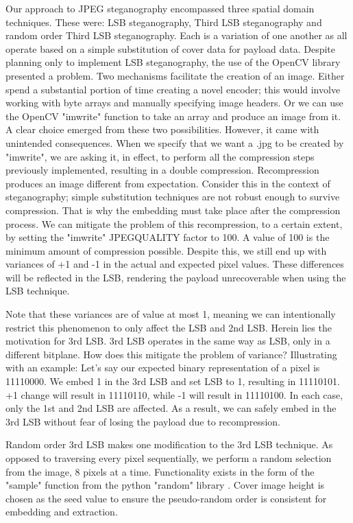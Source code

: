 \documentclass{l4proj}
\begin{document}
Our approach to JPEG steganography encompassed three spatial domain techniques. These were: LSB steganography, Third LSB steganography and random order Third LSB steganography. Each is a variation of one another as all operate based on a simple substitution of cover data for payload data. Despite planning only to implement LSB steganography, the use of the OpenCV library presented a problem. Two mechanisms facilitate the creation of an image. Either spend a substantial portion of time creating a novel encoder; this would involve working with byte arrays and manually specifying image headers. Or we can use the OpenCV "imwrite" function to take an array and produce an image from it. A clear choice emerged from these two possibilities. However, it came with unintended consequences.  When we specify that we want a .jpg to be created by "imwrite", we are asking it, in effect, to perform all the compression steps previously implemented, resulting in a double compression. Recompression produces an image different from expectation. Consider this in the context of steganography; simple substitution techniques are not robust enough to survive compression.  That is why the embedding must take place after the compression process. We can mitigate the problem of this recompression, to a certain extent, by setting the "imwrite" JPEG\-QUALITY factor to 100. A value of 100 is the minimum amount of compression possible. Despite this, we still end up with variances of +1 and -1 in the actual and expected pixel values. These differences will be reflected in the LSB, rendering the payload unrecoverable when using the LSB technique.

Note that these variances are of value at most 1, meaning we can intentionally restrict this phenomenon to only affect the LSB and 2nd LSB. Herein lies the motivation for 3rd LSB. 3rd LSB operates in the same way as LSB, only in a different bitplane. How does this mitigate the problem of variance? Illustrating with an example: Let's say our expected binary representation of a pixel is 11110000. We embed 1 in the 3rd LSB and set  LSB to 1, resulting in 11110101. +1 change will result in 11110110, while -1 will result in 11110100. In each case, only the 1st and 2nd LSB are affected. As a result, we can safely embed in the 3rd LSB without fear of losing the payload due to recompression. 

Random order 3rd LSB makes one modification to the 3rd LSB technique. As opposed to traversing every pixel sequentially, we perform a random selection from the image, 8 pixels at a time. Functionality exists in the form of the "sample" function from the python "random" library \citep{random}. Cover image height is chosen as the seed value to ensure the pseudo-random order is consistent for embedding and extraction. 
\end{document}
